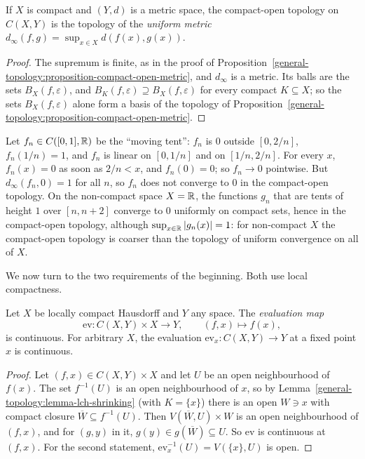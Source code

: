 \begin{corollary}\label{general-topology:corollary-compact-open-uniform}
If $X$ is compact and $(Y, d)$ is a metric space, the compact-open topology on $C(X, Y)$ is the topology of the \emph{uniform metric}
$d_\infty(f, g) = \sup_{x \in X}d(f(x), g(x))$.
\end{corollary}

\begin{proof}
The supremum is finite, as in the proof of Proposition~\ref{general-topology:proposition-compact-open-metric}, and $d_\infty$ is a metric. Its balls are the sets $B_X(f, \varepsilon)$, and
$B_K(f, \varepsilon) \supseteq B_X(f, \varepsilon)$ for every compact $K \subseteq X$; so the sets $B_X(f, \varepsilon)$ alone form a basis of the topology of
Proposition~\ref{general-topology:proposition-compact-open-metric}.
\end{proof}

\begin{example}\label{general-topology:example-uniform-not-pointwise}
Let $f_n \in C([0, 1], \mathbb{R})$ be the ``moving tent'': $f_n$ is $0$ outside $[0, 2/n]$, $f_n(1/n) = 1$, and $f_n$ is linear on $[0, 1/n]$ and on $[1/n, 2/n]$. For every $x$, $f_n(x) = 0$ as
soon as $2/n < x$, and $f_n(0) = 0$; so $f_n \to 0$ pointwise. But $d_\infty(f_n, 0) = 1$ for all $n$, so $f_n$ does not converge to $0$ in the compact-open topology. On the non-compact space
$X = \mathbb{R}$, the functions $g_n$ that are tents of height $1$ over $[n, n + 2]$ converge to $0$ uniformly on compact sets, hence in the compact-open topology, although $\sup_{x \in \mathbb{R}}|g_n(x)| = 1$:
for non-compact $X$ the compact-open topology is coarser than the topology of uniform convergence on all of $X$.
\end{example}

We now turn to the two requirements of the beginning. Both use local compactness.

\begin{proposition}\label{general-topology:proposition-evaluation}
Let $X$ be locally compact Hausdorff and $Y$ any space. The \emph{evaluation map}
\[
\mathrm{ev} \colon C(X, Y) \times X \to Y, \qquad (f, x) \mapsto f(x),
\]
is continuous. For arbitrary $X$, the evaluation $\mathrm{ev}_x \colon C(X, Y) \to Y$ at a fixed point $x$ is continuous.
\end{proposition}

\begin{proof}
Let $(f, x) \in C(X, Y) \times X$ and let $U$ be an open neighbourhood of $f(x)$. The set $f^{-1}(U)$ is an open neighbourhood of $x$, so by Lemma~\ref{general-topology:lemma-lch-shrinking}
(with $K = \{x\}$) there is an open $W \ni x$ with compact closure $\overline{W} \subseteq f^{-1}(U)$. Then $V(\overline{W}, U) \times W$ is an open neighbourhood of $(f, x)$, and for $(g, y)$ in it,
$g(y) \in g(\overline{W}) \subseteq U$. So $\mathrm{ev}$ is continuous at $(f, x)$. For the second statement, $\mathrm{ev}_x^{-1}(U) = V(\{x\}, U)$ is open.
\end{proof}

